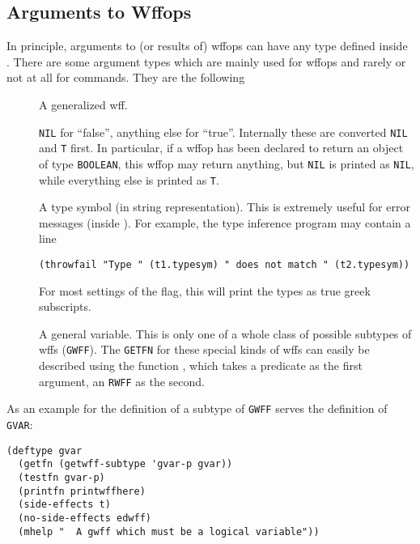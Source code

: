 \subsection{Arguments to Wffops}
In principle, arguments to (or results of) wffops can have any type
defined inside \tps.  There are some argument types which are mainly
used for wffops and rarely or not at all for commands.  They are the following
\begin{description}
\item [] A generalized wff.

\item [] {\tt NIL} for ``false'', anything else for ``true''.
Internally these are converted {\tt NIL} and {\tt T} first.  In particular,
if a wffop has been declared to return an object of type {\tt BOOLEAN},
this wffop may return anything, but {\tt NIL} is printed as {\tt NIL}, while
everything else is printed as {\tt T}.

\item [] A type symbol (in string representation).  This is
extremely useful for error messages (inside ).
For example, the type inference program may contain a line
\begin{verbatim}
(throwfail "Type " (t1.typesym) " does not match " (t2.typesym))
\end{verbatim}
For most settings of the  flag, this will print the types as true
greek subscripts.

\item [] A general variable.  This is only one of
a whole class of possible subtypes of wffs ({\tt GWFF}).  The {\tt GETFN} for
these special kinds of wffs can easily be described using the function
, which takes a predicate as the first argument,
an {\tt RWFF} as the second.
\end{description}

As an example for the definition of a subtype of {\tt GWFF} serves the definition
of {\tt GVAR}:
\begin{verbatim}
(deftype gvar
  (getfn (getwff-subtype 'gvar-p gvar))
  (testfn gvar-p)
  (printfn printwffhere)
  (side-effects t)
  (no-side-effects edwff)
  (mhelp "	A gwff which must be a logical variable"))
\end{verbatim}

